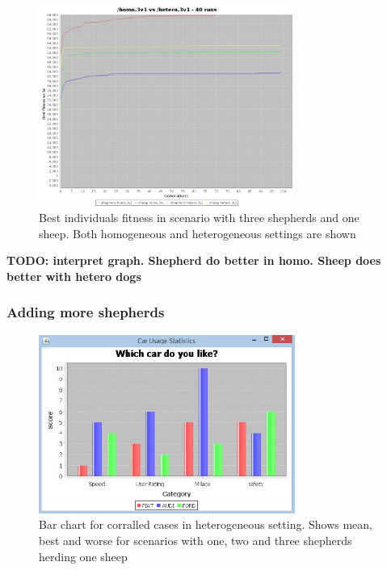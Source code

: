 \documentclass[conference]{IEEEtran}
\begin{document}
\begin{figure}[ht]
	\centering
	\includegraphics[width=3.3in]{imgs/homo3v1-hetero3v1-bestSoFar.jpeg}
	\caption{Best individuals fitness in scenario with three shepherds and one sheep. Both homogeneous and heterogeneous settings are shown}
	\label{fig:3v1_homo_vs_hetero}
\end{figure}

\textbf{TODO: interpret graph. Shepherd do better in homo. Sheep does better with hetero dogs}

\vspace{0.5em}
\subsubsection{Adding more shepherds}

\begin{figure}[ht]
	\centering
	\includegraphics[width=3.3in]{imgs/barchart.jpg}
	\caption{Bar chart for corralled cases in heterogeneous setting. Shows mean, best and worse for scenarios with one, two and three shepherds herding one sheep}
	\label{fig:corralled_oneSheep}
\end{figure}
\end{document}
